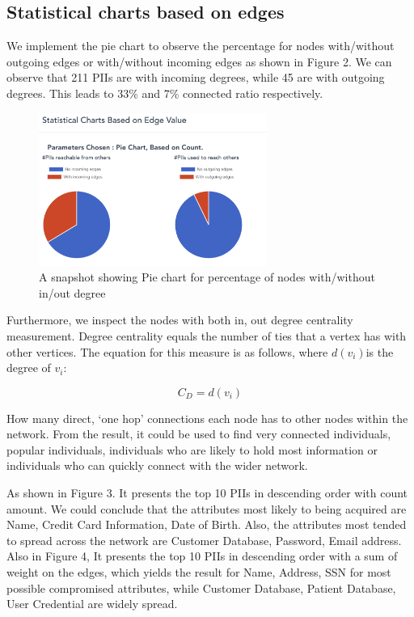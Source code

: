\documentclass[letterpaper, 10 pt, conference]{ieeeconf}  %
\begin{document}
\subsection{Statistical charts based on edges}
We implement the pie chart to observe the percentage for nodes with/without outgoing edges or with/without incoming edges as shown in Figure 2. We can observe that 211 PIIs are with incoming degrees, while 45 are with outgoing degrees. This leads to 33\% and 7\% connected ratio respectively.
\begin{figure}[h!]
  \includegraphics[width=\linewidth, height=5cm]{pic2.png}
  \caption{A snapshot showing Pie chart for percentage of nodes with/without in/out degree}
  \label{fig:pic2}
\end{figure}

Furthermore, we inspect the nodes with both in, out degree centrality measurement. Degree centrality equals the number of ties that a vertex has with other vertices. The equation for this measure is as follows, where $d(v_{i})$is the degree of $v_{i}$: 

\begin{equation}
C_{D} = d(v_{i})
\label{P}
\end{equation}

How many direct, ‘one hop’ connections each node has to other nodes within the network. From the result, it could be used to find very connected individuals, popular individuals, individuals who are likely to hold most information or individuals who can quickly connect with the wider network. 

As shown in Figure 3. It presents the top 10 PIIs in descending order with count amount. We could conclude that the attributes most likely to being acquired are Name, Credit Card Information, Date of Birth. Also, the attributes most tended to spread across the network are Customer Database, Password, Email address. Also in Figure 4, It presents the top 10 PIIs in descending order with a sum of weight on the edges, which yields the result for Name, Address, SSN for most possible compromised attributes, while Customer Database, Patient Database, User Credential are widely spread.
\end{document}
